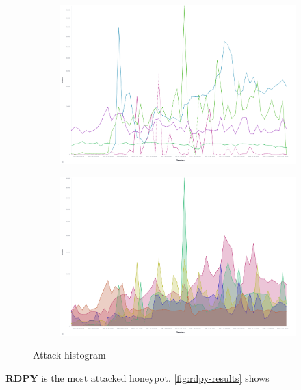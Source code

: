 \begin{figure}
    \centering

    \begin{subfigure}[b]{0.49\textwidth}
        \centering
        \includegraphics[width=\textwidth]{figures/tpot-overview-histogram.png}
        \caption{}
        \label{fig:tpot-attack-histogram}
    \end{subfigure}
    \hfill
    \begin{subfigure}[b]{0.49\textwidth}
        \centering
        \includegraphics[width=\textwidth]{figures/tpot-attack-histogram.png}
        \caption{}
        \label{fig:tpot-overview-histogram}
    \end{subfigure}
    \caption[Attack histogram]{Attack histogram}
    \label{fig:attacks}
\end{figure}

\textbf{RDPY} is the most attacked honeypot.
\autoref{fig:rdpy-results} shows 

